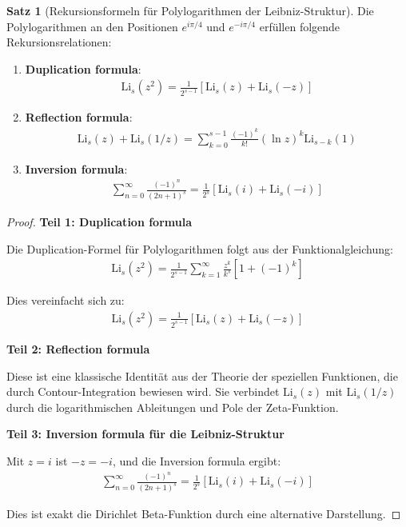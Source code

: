 \documentclass[a4paper,12pt,twoside]{report}
\theoremstyle{definition}
\newtheorem{satz}{Satz}
\begin{document}
\begin{satz}[Rekursionsformeln für Polylogarithmen der Leibniz-Struktur]
Die Polylogarithmen an den Positionen $e^{i\pi/4}$ und $e^{-i\pi/4}$ erfüllen folgende Rekursionsrelationen:

\begin{enumerate}
	\item \textbf{Duplication formula}:
	\begin{align}
		\text{Li}_s(z^2) = \frac{1}{2^{s-1}} [\text{Li}_s(z) + \text{Li}_s(-z)]
		\label{eq:polylog_duplication}
	\end{align}
	
	\item \textbf{Reflection formula}:
	\begin{align}
		\text{Li}_s(z) + \text{Li}_s(1/z) = \sum_{k=0}^{s-1} \frac{(-1)^k}{k!} (\ln z)^k \text{Li}_{s-k}(1)
		\label{eq:polylog_reflection}
	\end{align}
	
	\item \textbf{Inversion formula}:
	\begin{align}
		\sum_{n=0}^{\infty} \frac{(-1)^n}{(2n+1)^s} = \frac{1}{2^s} \left[ \text{Li}_s(i) + \text{Li}_s(-i) \right]
		\label{eq:leibniz_inversion}
	\end{align}
\end{enumerate}
\end{satz}

\begin{proof}
\textbf{Teil 1: Duplication formula}

Die Duplication-Formel für Polylogarithmen folgt aus der Funktionalgleichung:
\begin{align}
	\text{Li}_s(z^2) = \frac{1}{2^{s-1}} \sum_{k=1}^{\infty} \frac{z^k}{k^s} \left[ 1 + (-1)^k \right]
\end{align}

Dies vereinfacht sich zu:
\begin{align}
	\text{Li}_s(z^2) = \frac{1}{2^{s-1}} [\text{Li}_s(z) + \text{Li}_s(-z)]
\end{align}

\textbf{Teil 2: Reflection formula}

Diese ist eine klassische Identität aus der Theorie der speziellen Funktionen, die durch Contour-Integration bewiesen wird. Sie verbindet $\text{Li}_s(z)$ mit $\text{Li}_s(1/z)$ durch die logarithmischen Ableitungen und Pole der Zeta-Funktion.

\textbf{Teil 3: Inversion formula für die Leibniz-Struktur}

Mit $z = i$ ist $-z = -i$, und die Inversion formula ergibt:
\begin{align}
	\sum_{n=0}^{\infty} \frac{(-1)^n}{(2n+1)^s} = \frac{1}{2^s} [\text{Li}_s(i) + \text{Li}_s(-i)]
\end{align}

Dies ist exakt die Dirichlet Beta-Funktion durch eine alternative Darstellung.
\end{proof}
\end{document}
